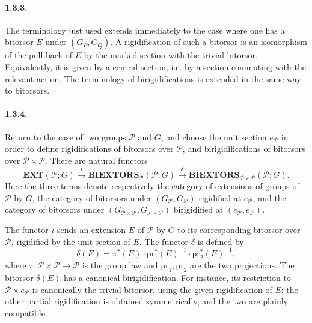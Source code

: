\documentclass[11pt]{article}
\theoremstyle{plain}
\theoremstyle{definition}
\theoremstyle{remark}
\begin{document}
\paragraph{1.3.3.} The terminology just used extends immediately to the case where one has a bitorsor $E$ under $(G_P,G_Q)$. A rigidification of such a bitorsor is an isomorphism of the pull-back of $E$ by the marked section with the trivial bitorsor. Equivalently, it is given by a central section, i.e. by a section commuting with the relevant action. The terminology of birigidifications is extended in the same way to bitorsors.

\paragraph{1.3.4.} Return to the case of two groups $\mathcal P$ and $G$, and choose the unit section $e_{\mathcal P}$ in order to define rigidifications of bitorsors over $\mathcal P$, and birigidifications of bitorsors over $\mathcal P\times\mathcal P$. There are natural functors
\begin{equation}
\mathbf{EXT}(\mathcal P;G)\xrightarrow{i}
\mathbf{BIEXTORS}_{\mathcal P}(\mathcal P;G)\xrightarrow{\delta}
\mathbf{BIEXTORS}_{\mathcal P\times\mathcal P}(\mathcal P;G).
\tag{1.3.4.1}
\end{equation}
Here the three terms denote respectively the category of extensions of groups of $\mathcal P$ by $G$, the category of bitorsors under $(G_{\mathcal P},G_{\mathcal P})$ rigidified at $e_{\mathcal P}$, and the category of bitorsors under $(G_{\mathcal P\times\mathcal P},G_{\mathcal P\times\mathcal P})$ birigidified at $(e_{\mathcal P},e_{\mathcal P})$.

The functor $i$ sends an extension $E$ of $\mathcal P$ by $G$ to its corresponding bitorsor over $\mathcal P$, rigidified by the unit section of $E$. The functor $\delta$ is defined by
\begin{equation}
\delta(E)=\pi^*(E)\cdot \mathrm{pr}_1^*(E)^{-1}\cdot \mathrm{pr}_2^*(E)^{-1},
\tag{1.3.4.2}
\end{equation}
where $\pi:\mathcal P\times\mathcal P\to\mathcal P$ is the group law and $\mathrm{pr}_1,\mathrm{pr}_2$ are the two projections. The bitorsor $\delta(E)$ has a canonical birigidification. For instance, its restriction to $\mathcal P\times e_{\mathcal P}$ is canonically the trivial bitorsor, using the given rigidification of $E$; the other partial rigidification is obtained symmetrically, and the two are plainly compatible.
\end{document}
